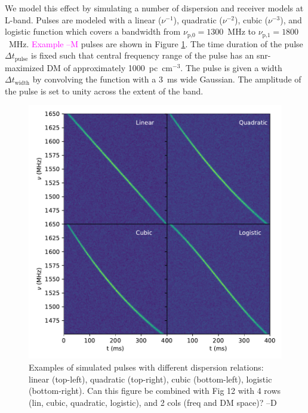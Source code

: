 \documentclass[a4paper,fleqn,usenatbib]{mnras}
\newcommand{\cM}[1]{\textcolor{magenta}{ #1 --M}}
\newcommand{\dcp}[1]{\textcolor{rgb:-green!30!yellow,3;green!30!yellow,2;red,1}{ #1 --D}}
\begin{document}
We model this effect by
simulating a number of dispersion and receiver models at L-band.  Pulses are
modeled with a linear ($\nu^{-1}$), quadratic ($\nu^{-2}$), cubic ($\nu^{-3}$),
and logistic function which covers a bandwidth from $\nu_{\textrm{p,0}} =
1300$~MHz to $\nu_{\textrm{p,1}} = 1800$~MHz. \cM{Example} pulses are shown in Figure
\ref{fig:sim_pulse_spectra}. The time duration of the pulse $\Delta
t_{\textrm{pulse}}$ is fixed such that central frequency range of the pulse has
an \gls{snr}-maximized DM of approximately 1000~pc~cm$^{-3}$. The pulse is given
a width $\Delta t_{\textrm{width}}$ by convolving the function with a 3~ms wide
Gaussian. The amplitude of the pulse is set to unity across the extent of the
band.


\begin{figure}
    \includegraphics[width=1.0\linewidth]{figures/sim_pulse_spectra.pdf}
    \caption{Examples of simulated pulses with different dispersion relations:
    linear (top-left), quadratic (top-right), cubic (bottom-left), logistic
    (bottom-right).
    \dcp{Can this figure be combined with Fig 12 with 4 rows (lin, cubic, quadratic, logistic), and 2 cols (freq and DM space)?}
    }
    \label{fig:sim_pulse_spectra}
\end{figure}
\end{document}
